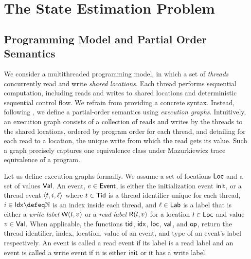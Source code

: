 
\section{The State Estimation Problem}
\label{sec:problem}
\subsection{Programming Model and Partial Order Semantics}

We consider a multithreaded programming model, in which a set of \emph{threads} concurrently read and write \emph{shared locations}.
Each thread performs sequential computation, including reads and writes to shared locations and deterministic sequential control flow.
We refrain from providing a concrete syntax.
Instead, following \cite{trust}, we define a partial-order semantics using \emph{execution graphs}.
Intuitively, an execution graph consists of a collection of reads and writes by the threads to the shared locations,
ordered by program order for each thread, and
detailing for each read to a location, the unique write from which the read gets its value. 
Such a graph precisely captures one equivalence class under Mazurkiewicz trace equivalence of a program. 

Let us define execution graphs formally.
We assume a set of locations $\mathsf{Loc}$ and a set of values $\mathsf{Val}$.
An event, \( e \in  \mathsf{Event}\), is either the initialization event $\mathsf{init}$, or a thread event
\({\langle t, i, \ell\rangle}\) where $t \in \mathsf{Tid}$ is a thread identifier unique for each thread, 
$i \in \Idx \defeq \nats$ is an index inside each thread, and
$\ell \in \mathsf{Lab}$ is a label that is either a \emph{write label}
$\mathsf{W}(l, v)$ or a \emph{read label} $\mathsf{R}(l, v)$ for a location $l\in\mathsf{Loc}$ and value $v\in \mathsf{Val}$.
%
When applicable, the functions $\mathsf{tid}$, $\mathsf{idx}$, $\mathsf{loc}$, $\mathsf{val}$, and $\mathsf{op}$, return the thread identifier, index,
location, value of an event, and type of an event's label respectively. 
An event is called a read event if its label is a read label and an event is called
a write event if it is either $\mathsf{init}$ or it has a write label.



